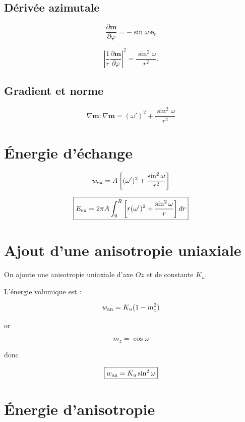 \documentclass[11pt,a4paper]{article}
\begin{document}

\subsection{Dérivée azimutale}

\[
\frac{\partial\mathbf m}{\partial\varphi}
=
-\sin\omega\,\mathbf e_r
\]

\[
\left|\frac1r\frac{\partial\mathbf m}{\partial\varphi}\right|^2
=
\frac{\sin^2\omega}{r^2}.
\]


\subsection{Gradient et norme}

\[
\boxed{
\nabla\mathbf m:\nabla\mathbf m
=
(\omega')^2+\frac{\sin^2\omega}{r^2}
}
\]


\section{Énergie d'échange}

\[
w_{\rm ex}
=
A\left[
(\omega')^2+\frac{\sin^2\omega}{r^2}
\right]
\]

\[
\boxed{
E_{\rm ex}
=
2\pi A
\int_0^R
\left[
r(\omega')^2+\frac{\sin^2\omega}{r}
\right]dr
}
\]


\section{Ajout d'une anisotropie uniaxiale}

On ajoute une anisotropie uniaxiale d'axe $Oz$ et de constante $K_u$.

L'énergie volumique est :

\[
w_{\rm an}
=
K_u(1-m_z^2)
\]

or

\[
m_z=\cos\omega
\]

donc

\[
\boxed{
w_{\rm an}=K_u\sin^2\omega
}
\]


\section{Énergie d'anisotropie}
\end{document}
